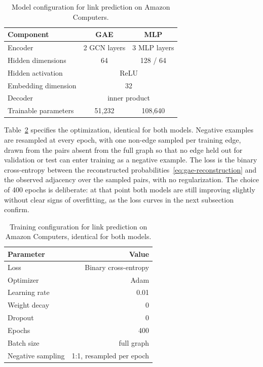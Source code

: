 \begin{table}
  \caption[Model configuration, link prediction.]{%
    Model configuration for link prediction on Amazon Computers.
  }
  \label{tab:gae-model}
  \begin{center}
    \small
    \begin{tabular}{lcc}
      \toprule
      Component            & GAE          & MLP \\
      \midrule
      Encoder              & 2 GCN layers & 3 MLP layers \\
      Hidden dimensions    & 64           & 128 / 64 \\
      Hidden activation       &\multicolumn{2}{c}{ReLU} \\
      Embedding dimension  &\multicolumn{2}{c}{32} \\
      Decoder              & \multicolumn{2}{c}{inner product} \\
      Trainable parameters   & 51{,}232     & 108{,}640 \\
      \bottomrule
    \end{tabular}
  \end{center}
\end{table}

Table~\ref{tab:gae-training} specifies the optimization, identical for both
models. Negative examples are resampled at every epoch, with one
non-edge sampled per training edge, drawn from the pairs absent from the full graph so
that no edge held out for validation or test can enter training as a negative example.
The loss is the binary cross-entropy between the reconstructed
probabilities~\eqref{eq:gae-reconstruction} and the observed
adjacency over the sampled pairs, with no regularization.
The choice of 400 epochs is deliberate: at that point both models are
still improving slightly without clear signs of overfitting, as the loss curves
in the next subsection confirm.

\begin{table}
  \caption[Training configuration, link prediction.]{%
    Training configuration for link prediction on Amazon Computers, identical
    for both models.
  }
  \label{tab:gae-training}
  \begin{center}
    \small
    \begin{tabular}{lr}
      \toprule
      Parameter         & Value \\
      \midrule
      Loss             & Binary cross-entropy \\
      Optimizer         & Adam \\
      Learning rate     & 0.01 \\
      Weight decay      & 0 \\
      Dropout           & 0 \\
      Epochs            & 400 \\
      Batch size        & full graph \\
      Negative sampling & 1:1, resampled per epoch \\
      \bottomrule
    \end{tabular}
  \end{center}
\end{table}

